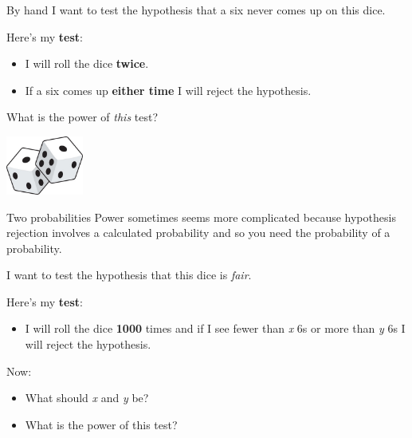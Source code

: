 \documentclass[
  11pt,
  ignorenonframetext,
]{beamer}
\providecommand{\tightlist}{%
  \setlength{\itemsep}{0pt}\setlength{\parskip}{0pt}}\usepackage{longtable,booktabs,array}
\begin{document}
\begin{frame}{By hand}
\protect\hypertarget{by-hand-1}{}
I want to test the hypothesis that a six never comes up on this dice.

Here's my \textbf{test}:

\begin{itemize}
\tightlist
\item
  I will roll the dice \textbf{twice}.
\item
  If a six comes up \textbf{either time} I will reject the hypothesis.
\end{itemize}

What is the power of \emph{this} test?

\includegraphics[width=1in,height=\textheight]{assets/dice.jpeg}
\end{frame}

\begin{frame}{Two probabilities}
\protect\hypertarget{two-probabilities}{}
Power sometimes seems more complicated because hypothesis rejection
involves a calculated probability and so you need the probability of a
probability.

I want to test the hypothesis that this dice is \emph{fair}.

Here's my \textbf{test}:

\begin{itemize}
\tightlist
\item
  I will roll the dice \textbf{1000} times and if I see fewer than
  \emph{x} 6s or more than \emph{y} 6s I will reject the hypothesis.
\end{itemize}

Now:

\begin{itemize}
\tightlist
\item
  What should \emph{x} and \emph{y} be?
\item
  What is the power of this test?
\end{itemize}
\end{frame}
\end{document}
